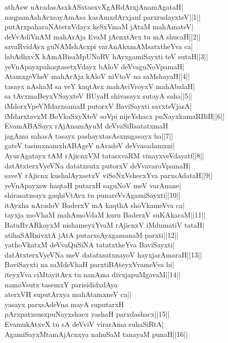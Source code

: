 \documentclass{article}
\begin{document}
athAsw nAradasAsxkASxtasxvXgARdArxjAnamAgataH|\\
naqpamAshAvxsayAmAsa kasAmxdArxjanf parxrudayxteV||1||\\
putArxpaharaNAtetxVdayx keSxVmaM jAtaM mahAmateV|\\
deVvAdiVnAM mahArAja EvaM jAcnxtAvx tu mA shucaH||2||\\
savaRvidAyx guNAMshAcxpi varAnAkxmAMsatxtheYva ca|\\
labAdhxvX kAmABisaMpUNoRV hAyxgamiSayxti teV sutaH||3||\\
yeVnApayxpahaqtasetxVdayx bAloV deVvaguNoVpamaH|\\
AtamxgeVheV mahArAja kAloV niVtoV na saMshayaH||4||\\
tasayx nAshaM sa veY kaqtAvx mahAviVroyxV mahAbalaH|\\
sa tAvxmaBeyxVSayxteV BUyaH shivasayx sutayA saha||5||\\
iMdorxVpeVMdarxsamaH putorxV BaviSayxti savxteVjasA|\\
iMdarxtavxM BoVkaSxyXteV soVpi nijeYshacx puNayxkamaRBiH||6||\\
EvamABASayx rAjAnamAyuM deVvaSiRsatatxmaH\\
jagAma sahasA tasayx pashayxtasAsxnugasayx ha||7||\\
gateV tasimxnamxhABAgeV nAradeV deVvasadamxni|\\
AyurAgatayx tAM rAjicnxVM tatasxvaRM vinayxveVdayatf||8||\\
datAtxterxVyeVNa datatxsutx putorxV deVvavaroVpamaH|\\
saveY rAjicnx kushalAyxsetxV viSoNxVshecxYva parxsAdataH||9||\\
yeVnApayxsw haqtaH putarxH saguNoV meV varAnane|\\
shirasatxsayx gaqhiVtAvx tu punareVvAgamiSayxti||10||\\
itAyxha nAradoV BaderxV mA kaqthA shoVkameVva ca|\\
tayxja moVhaM mahAmoVdaM kuru BaderxV suKAkaraM||11||\\
BatuRvARkayxM nishameyxYvaM rAjicnxV iMdumatiV tataH|\\
atihaSARnivxtA jAtA putarxsAyxgamanaM parxti||12||\\
yathoVkatxM deVvaQuSiNA tatatxtheYva BaviSayxti|\\
datAtxterxVyeVNa meV datatxsatxnayoV hayxjarAmaraH||13||\\
BaviSayxti na saMdeVhaH parxtiBAteyxVvameVva hi|\\
iteyxVva ciMtayitAvx tu nanAma divxjapuMgavaM||14||\\
namoVsutx tasemxY parisididxdAya\\
aterxVH suputArxya mahAtamxneV ca||\\
yasayx parxsAdeVna mayA suputarxH\\
pArxpatxsusxpuNayxshacx yashaH parxdashacx||15||\\
EvamukAtxvX tu sA deVviV virarAma suhaSiRtA|\\
AgamiSayxMtamAjAcnxya nahuSaM tanayaM punaH||16||
\end{document}
